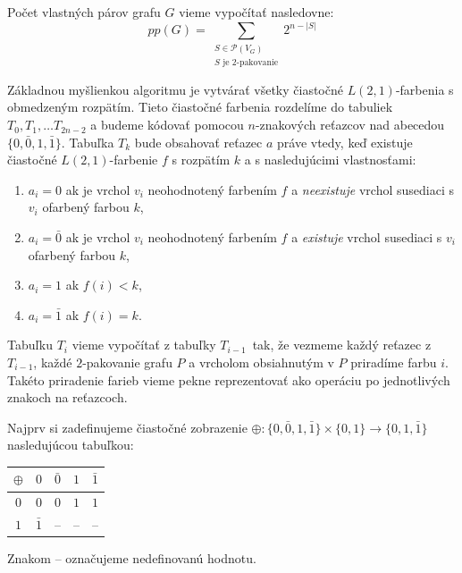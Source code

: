 \begin{pozn}
    \label{pp_g}
    Počet vlastných párov grafu $G$ vieme vypočítať nasledovne:
    $$pp(G) = \sum_{\substack{S \in \mathcal{P}(V_G) \\ S \textrm{ je } 2 \textrm{-pakovanie}}} 2^{n - |S|}$$
\end{pozn}

Základnou myšlienkou algoritmu je vytvárať všetky čiastočné $L(2,1)$-farbenia s obmedzeným rozpätím.
Tieto čiastočné farbenia rozdelíme do tabuliek $T_0, T_1, \ldots T_{2n-2}$ a budeme kódovať pomocou
$n$-znakových reťazcov nad abecedou $\{0, \bar{0}, 1, \bar{1}\}$. Tabuľka $T_k$ bude obsahovať
reťazec $a$ práve vtedy, keď existuje čiastočné $L(2,1)$-farbenie $f$ s rozpätím $k$ a s nasledujúcimi vlastnosťami:

\begin{enumerate}
    \item $a_i = 0$ ak je vrchol $v_i$ neohodnotený farbením $f$ a \emph{neexistuje} vrchol susediaci s $v_i$ ofarbený farbou $k$,
    \item $a_i = \bar{0}$ ak je vrchol $v_i$ neohodnotený farbením $f$ a \emph{existuje} vrchol susediaci s $v_i$ ofarbený farbou $k$,
    \item $a_i = 1$ ak $f(i) < k$,
    \item $a_i = \bar{1}$ ak $f(i) = k$.
\end{enumerate}

Tabuľku $T_i$ vieme vypočítať z tabuľky $T_{i-1}$ tak, že vezmeme každý reťazec z $T_{i-1}$, každé
$2$-pakovanie grafu $P$ a vrcholom obsiahnutým v $P$ priradíme farbu $i$. Takéto priradenie farieb
vieme pekne reprezentovať ako operáciu po jednotlivých znakoch na reťazcoch.

Najprv si zadefinujeme čiastočné zobrazenie $\oplus : \{ 0, \bar{0}, 1, \bar{1}\} \times \{ 0, 1 \} \rightarrow \{0, 1, \bar{1}\}$
nasledujúcou tabuľkou:

\begin{tabular}{c | c c c c}
    $\oplus$ & $0$ & $\bar{0}$ & $1$ & $\bar{1}$ \\
    \hline
    $0$ & $0$ & $0$ & $1$ & $1$ \\
    $1$ & $\bar{1}$ & -- & -- & -- \\
\end{tabular}

Znakom -- označujeme nedefinovanú hodnotu.

